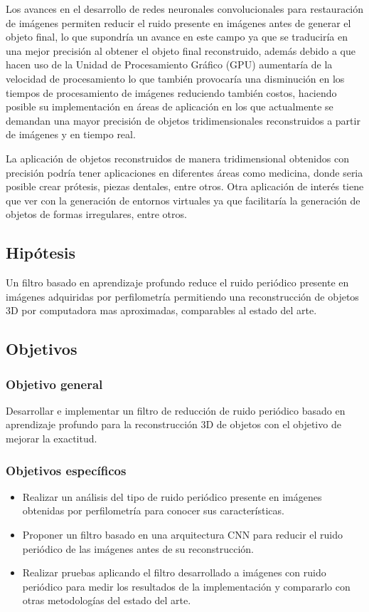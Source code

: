 \documentclass[10pt,letterpaper]{article}
\begin{document}
Los avances en el desarrollo de redes neuronales convolucionales para restauración de imágenes permiten reducir el ruido presente en imágenes antes de generar el objeto final, lo que supondría un avance en este campo ya que se traduciría en una mejor precisión al obtener el objeto final reconstruido, además debido a que hacen uso de la Unidad de Procesamiento Gráfico (GPU) aumentaría de la velocidad de procesamiento lo que también provocaría una disminución en los tiempos de procesamiento de imágenes reduciendo también costos, haciendo posible su implementación en áreas de aplicación en los que actualmente se demandan una mayor precisión de objetos tridimensionales reconstruidos a partir de imágenes y en tiempo real.

La aplicación de objetos reconstruidos de manera tridimensional obtenidos con precisión podría tener aplicaciones en diferentes áreas como medicina, donde seria posible crear prótesis, piezas dentales, entre otros. Otra aplicación de interés tiene que ver con la generación de entornos virtuales ya que facilitaría la generación de objetos de formas irregulares, entre otros. 

\subsection{Hipótesis}
Un filtro basado en aprendizaje profundo reduce el ruido periódico presente en imágenes adquiridas por perfilometría permitiendo una reconstrucción de objetos 3D por computadora mas aproximadas, comparables al estado del arte.

\subsection{Objetivos}
\subsubsection{Objetivo general}
Desarrollar e implementar un filtro de reducción de ruido periódico basado en aprendizaje profundo para la reconstrucción 3D de objetos con el objetivo de mejorar la exactitud.

\subsubsection{Objetivos específicos}
\begin{itemize}
\item Realizar un análisis del tipo de ruido periódico presente en imágenes obtenidas por perfilometría para conocer sus características.

\item Proponer un filtro basado en una arquitectura CNN para reducir el ruido periódico de las imágenes antes de su reconstrucción.

\item Realizar pruebas aplicando el filtro desarrollado a imágenes con ruido periódico para medir los resultados de la implementación y compararlo con otras metodologías del estado del arte.

\end{itemize}
\end{document}
